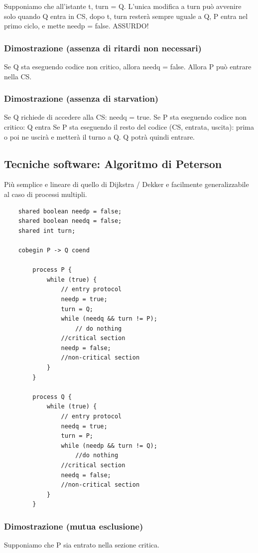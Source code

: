 Supponiamo che all'istante t, turn = Q.
L'unica modifica a turn può avvenire solo quando Q entra in CS, dopo t, turn resterà sempre uguale a Q, P entra nel primo ciclo, e mette needp = false.
\newline
ASSURDO!

\subsubsection{Dimostrazione (assenza di ritardi non necessari)}
Se Q sta eseguendo codice non critico, allora needq = false.
Allora P può entrare nella CS.

\subsubsection{Dimostrazione (assenza di starvation)}
Se Q richiede di accedere alla CS: needq = true.
Se P sta eseguendo codice non critico: Q entra
Se P sta eseguendo il resto del codice (CS, entrata, uscita): prima o poi ne uscirà e metterà il turno a Q.
Q potrà quindi entrare.

\subsection{Tecniche software: Algoritmo di Peterson}
Più semplice e lineare di quello di Dijkstra / Dekker
e facilmente generalizzabile al caso di processi multipli.

\begin{lstlisting}
    shared boolean needp = false;
    shared boolean needq = false;
    shared int turn;
    
    cobegin P -> Q coend
        
        process P {
            while (true) {
                // entry protocol
                needp = true;
                turn = Q;
                while (needq && turn != P); 
                    // do nothing
                //critical section
                needp = false;
                //non-critical section
            }
        }

        process Q {
            while (true) {
                // entry protocol
                needq = true;
                turn = P;
                while (needp && turn != Q);
                    //do nothing
                //critical section
                needq = false;
                //non-critical section
            }
        }
\end{lstlisting}

\subsubsection{Dimostrazione (mutua esclusione)}
Supponiamo che P sia entrato nella sezione critica.

